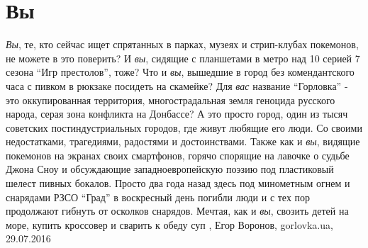  
 
 
 
 
\chapter{Вы}

\emph{Вы}, те, кто сейчас ищет спрятанных в парках, музеях и стрип-клубах покемонов,
не можете в это поверить? И \emph{вы}, сидящие с планшетами в метро над 10 серией 7
сезона \enquote{Игр престолов}, тоже? Что и \emph{вы}, вышедшие в город без комендантского
часа с пивком в рюкзаке посидеть на скамейке? Для \emph{вас} название \enquote{Горловка} - это
оккупированная территория, многострадальная земля геноцида русского народа,
серая зона конфликта на Донбассе? А это просто город, один из тысяч советских
постиндустриальных городов, где живут любящие его люди. Со своими недостатками,
трагедиями, радостями и достоинствами. Также как и \emph{вы}, видящие покемонов на
экранах своих смартфонов, горячо спорящие на лавочке о судьбе Джона Сноу и
обсуждающие западноевропейскую поэзию под пластиковый шелест пивных бокалов.
Просто два года назад здесь под минометным огнем и снарядами РЗСО \enquote{Град} в
воскресный день погибли люди и с тех пор продолжают гибнуть от осколков
снарядов. Мечтая, как и \emph{вы}, свозить детей на море, купить кроссовер и сварить к
обеду суп
, 
Егор Воронов, gorlovka.ua, 29.07.2016

